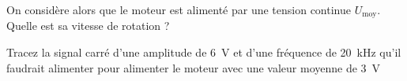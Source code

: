 \documentclass[10pt,fleqn]{article} %
\begin{document}
\begin{question}
  On considère alors que le moteur est alimenté par une tension continue $U_\text{moy}$. Quelle est sa vitesse de rotation ?
\end{question}

\begin{question}
  Tracez la signal carré d'une amplitude de \SI{6}{V} et d'une fréquence de \SI{20}{kHz} qu'il faudrait alimenter pour alimenter le moteur avec une valeur moyenne de \SI{3}{V}
\end{question}
\end{document}
